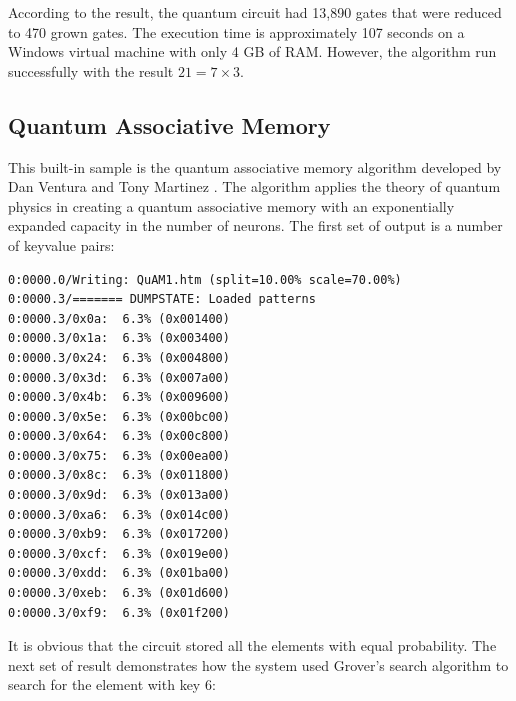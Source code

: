 \documentclass[12pt]{third-rep}
\begin{document}
According to the result, the quantum circuit had 13,890 gates that were reduced to 470 grown gates. The execution time is approximately 107 seconds on a Windows virtual machine with only 4 GB of RAM. However, the algorithm run successfully with the result $21 = 7\times3$.

\subsection{Quantum Associative Memory}
This built-in sample is the quantum associative memory algorithm developed by Dan Ventura and Tony Martinez \cite{qam}. The algorithm applies the theory of quantum physics in creating a quantum associative memory with an exponentially expanded capacity in the number of neurons. The first set of output is a number of key\/value pairs:
\begin{verbatim}
0:0000.0/Writing: QuAM1.htm (split=10.00% scale=70.00%)
0:0000.3/======= DUMPSTATE: Loaded patterns
0:0000.3/0x0a:  6.3% (0x001400)
0:0000.3/0x1a:  6.3% (0x003400)
0:0000.3/0x24:  6.3% (0x004800)
0:0000.3/0x3d:  6.3% (0x007a00)
0:0000.3/0x4b:  6.3% (0x009600)
0:0000.3/0x5e:  6.3% (0x00bc00)
0:0000.3/0x64:  6.3% (0x00c800)
0:0000.3/0x75:  6.3% (0x00ea00)
0:0000.3/0x8c:  6.3% (0x011800)
0:0000.3/0x9d:  6.3% (0x013a00)
0:0000.3/0xa6:  6.3% (0x014c00)
0:0000.3/0xb9:  6.3% (0x017200)
0:0000.3/0xcf:  6.3% (0x019e00)
0:0000.3/0xdd:  6.3% (0x01ba00)
0:0000.3/0xeb:  6.3% (0x01d600)
0:0000.3/0xf9:  6.3% (0x01f200)
\end{verbatim}
It is obvious that the circuit stored all the elements with equal probability. The next set of result demonstrates how the system used Grover's search algorithm to search for the element with key 6:
\end{document}
